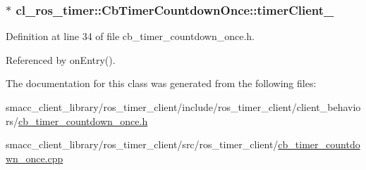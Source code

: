 \subsubsection[{\texorpdfstring{timer\+Client\+\_\+}{timerClient_}}]{$\ast$ cl\+\_\+ros\+\_\+timer\+::\+Cb\+Timer\+Countdown\+Once\+::timer\+Client\+\_\+\hspace{0.3cm}{\ttfamily [private]}}\hypertarget{classcl__ros__timer_1_1CbTimerCountdownOnce_a2a969a829fcb39abcc0380ee420e3300}{}\label{classcl__ros__timer_1_1CbTimerCountdownOnce_a2a969a829fcb39abcc0380ee420e3300}


Definition at line 34 of file cb\+\_\+timer\+\_\+countdown\+\_\+once.\+h.



Referenced by on\+Entry().



The documentation for this class was generated from the following files\+:\begin{DoxyCompactItemize}
\item 
smacc\+\_\+client\+\_\+library/ros\+\_\+timer\+\_\+client/include/ros\+\_\+timer\+\_\+client/client\+\_\+behaviors/\hyperlink{cb__timer__countdown__once_8h}{cb\+\_\+timer\+\_\+countdown\+\_\+once.\+h}\item 
smacc\+\_\+client\+\_\+library/ros\+\_\+timer\+\_\+client/src/ros\+\_\+timer\+\_\+client/\hyperlink{cb__timer__countdown__once_8cpp}{cb\+\_\+timer\+\_\+countdown\+\_\+once.\+cpp}\end{DoxyCompactItemize}
